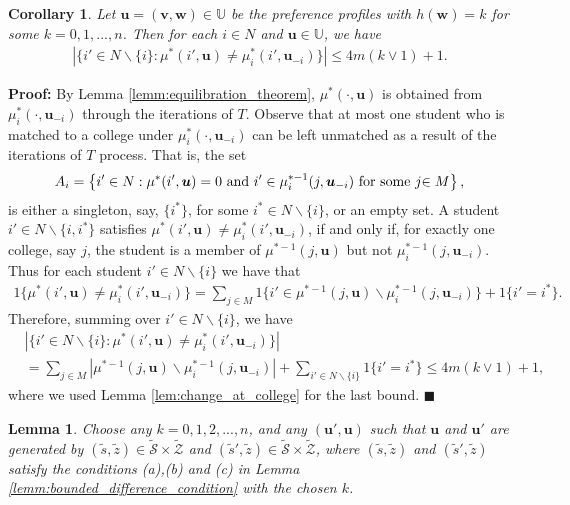 \documentclass[12pt, fullpage]{amsart}
\newtheorem{lemma}{Lemma}[section]
\newtheorem{corollary}{Corollary}[section]
\theoremstyle{definition}
\theoremstyle{definition}
\theoremstyle{definition}
\begin{document}
\begin{bibunit}[econometrica]
\begin{corollary}\label{cor:students_changing}
	Let $\boldsymbol{u} = (\boldsymbol{v},\boldsymbol{w}) \in\mathbb{U}$ be the preference profiles with $h(\boldsymbol{w}) =k$ for some $k = 0,1,...,n$. Then for each $i\in N$ and $\boldsymbol{u}\in\mathbb{U}$, we
	have 
	\begin{align*}
		|\{i'\in N\backslash\{i\}:\mu^*(i',\boldsymbol{u})\neq\mu_{i}^*(i',\boldsymbol{u}_{-i})\}|\leq 4m(k\vee1)+1.
	\end{align*}
	
\end{corollary}

\noindent \textbf{Proof: } By Lemma \ref{lemm:equilibration_theorem}, $\mu^*(\cdot,\boldsymbol{u})$ is obtained from $\mu_{i}^*(\cdot,\boldsymbol{u}_{-i})$ through the iterations of $T$. Observe that at most one student who is matched to a college under
$\mu_i^*(\cdot,\boldsymbol{u}_{-i})$ can be left unmatched as a result of the
iterations of $T$ process. That is, the set 
\[
A_i=\left\{i'\in N:\mu^*(i',\boldsymbol{u})=0\text{ and }i'\in\mu_{i}^{*-1}(j,\boldsymbol{u}_{-i})\text{ for some }j\text{\ensuremath{\in M}}\right\},
\]
is either a singleton, say, $\{i^{*}\}$, for some $i^{*}\in N\backslash\{i\}$, or an empty set. 
A student $i'\in N\backslash\{i,i^{*}\}$ satisfies $\mu^*(i',\boldsymbol{u})\neq\mu_{i}^*(i',\boldsymbol{u}_{-i})$,
if and only if, for exactly one college, say $j$, the student is a member of $\mu^{*-1}(j,\boldsymbol{u})$
but not $\mu_{i}^{*-1}(j,\boldsymbol{u}_{-i})$. Thus for each student $i'\in N\backslash\{i\}$ we have that
\begin{align*}
	1\{\mu^*(i',\boldsymbol{u})\neq\mu_{i}^*(i',\boldsymbol{u}_{-i})\}= \sum_{j\in M}1\{i'\in\mu^{*-1}(j,\boldsymbol{u})\backslash\mu_{i}^{*-1}(j,\boldsymbol{u}_{-i})\}+1\{i'=i^{*}\}.
\end{align*}
Therefore, summing over $i'\in N\backslash\{i\}$, we have 
\begin{align*}
	& |\{i'\in N\backslash\{i\}:\mu^*(i',\boldsymbol{u})\neq\mu_{i}^*(i',\boldsymbol{u}_{-i})\}|\\
	&= \sum_{j\in M}|\mu^{*-1}(j,\boldsymbol{u})\backslash\mu_{i}^{*-1}(j,\boldsymbol{u}_{-i})|+\sum_{i'\in N\backslash\{i\}}1\{i'=i^{*}\}\le  4m(k\vee1)+1,
\end{align*}
where we used Lemma \ref{lem:change_at_college} for the last bound.  $\blacksquare$\medskip

\begin{lemma}\label{lemm:BDC sosm} Choose any $k=0,1,2,...,n$, and any $(\boldsymbol{u}',\boldsymbol{u})$ such that $\boldsymbol{u}$ and $\boldsymbol{u}'$ are generated by $(\tilde s, \tilde z) \in \mathcal{\tilde S} \times \mathcal{\tilde Z}$ and $(\tilde s', \tilde z) \in \mathcal{\tilde S} \times \mathcal{\tilde Z}$, where $(\tilde s,\tilde z)$ and $(\tilde s',\tilde z)$ satisfy the conditions (a),(b) and (c) in Lemma \ref{lemm:bounded_difference_condition} with the chosen $k$.
	

\end{lemma}
\end{bibunit}
\end{document}
